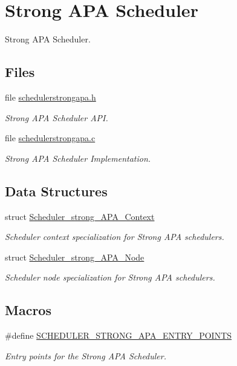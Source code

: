 \hypertarget{group__RTEMSScoreSchedulerStrongAPA}{}\section{Strong A\+PA Scheduler}
\label{group__RTEMSScoreSchedulerStrongAPA}


Strong A\+PA Scheduler.  


\subsection*{Files}
\begin{DoxyCompactItemize}
\item 
file \mbox{\hyperlink{schedulerstrongapa_8h}{schedulerstrongapa.\+h}}
\begin{DoxyCompactList}\small\item\em Strong A\+PA Scheduler A\+PI. \end{DoxyCompactList}\item 
file \mbox{\hyperlink{schedulerstrongapa_8c}{schedulerstrongapa.\+c}}
\begin{DoxyCompactList}\small\item\em Strong A\+PA Scheduler Implementation. \end{DoxyCompactList}\end{DoxyCompactItemize}
\subsection*{Data Structures}
\begin{DoxyCompactItemize}
\item 
struct \mbox{\hyperlink{structScheduler__strong__APA__Context}{Scheduler\+\_\+strong\+\_\+\+A\+P\+A\+\_\+\+Context}}
\begin{DoxyCompactList}\small\item\em Scheduler context specialization for Strong A\+PA schedulers. \end{DoxyCompactList}\item 
struct \mbox{\hyperlink{structScheduler__strong__APA__Node}{Scheduler\+\_\+strong\+\_\+\+A\+P\+A\+\_\+\+Node}}
\begin{DoxyCompactList}\small\item\em Scheduler node specialization for Strong A\+PA schedulers. \end{DoxyCompactList}\end{DoxyCompactItemize}
\subsection*{Macros}
\begin{DoxyCompactItemize}
\item 
\#define \mbox{\hyperlink{group__RTEMSScoreSchedulerStrongAPA_ga98b37281082c0be47dc489eed554c5cc}{S\+C\+H\+E\+D\+U\+L\+E\+R\+\_\+\+S\+T\+R\+O\+N\+G\+\_\+\+A\+P\+A\+\_\+\+E\+N\+T\+R\+Y\+\_\+\+P\+O\+I\+N\+TS}}
\begin{DoxyCompactList}\small\item\em Entry points for the Strong A\+PA Scheduler. \end{DoxyCompactList}\end{DoxyCompactItemize}
